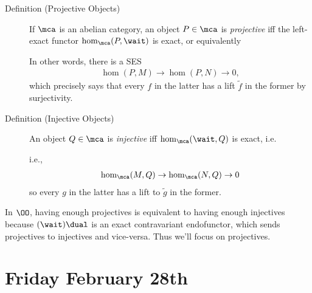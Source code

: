 \begin{description}
\item[Definition (Projective Objects)]
If \(\mca\) is an abelian category, an object \(P\in\mca\) is
\emph{projective} iff the left-exact functor \(\hom_\mca(P, \wait)\) is
exact, or equivalently

\begin{center}
\end{center}

In other words, there is a SES
\begin{align*}\hom(P, M) \to \hom(P, N) \to 0,\end{align*} which
precisely says that every \(f\) in the latter has a lift \(\tilde f\) in
the former by surjectivity.
\item[Definition (Injective Objects)]
An object \(Q\in\mca\) is \emph{injective} iff \(\hom_\mca(\wait, Q)\)
is exact, i.e.

\begin{center}
\end{center}

i.e.,
\begin{align*}\hom_\mca(M, Q) \to \hom_\mca(N, Q) \to 0\end{align*} so
every \(g\) in the latter has a lift to \(\tilde g\) in the former.
\end{description}

In \(\OO\), having enough projectives is equivalent to having enough
injectives because \((\wait)\dual\) is an exact contravariant
endofunctor, which sends projectives to injectives and vice-versa. Thus
we'll focus on projectives.

\hypertarget{friday-february-28th}{%
\section{Friday February 28th}\label{friday-february-28th}}

